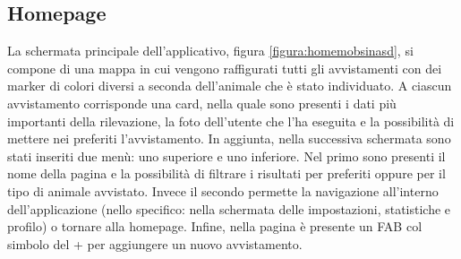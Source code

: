 \documentclass[a4paper,final,12pt]{report}
\begin{document}
\subsection{Homepage}
La schermata principale dell'applicativo, figura \ref{figura:homemobsinasd}, si compone di una mappa in cui vengono raffigurati tutti gli avvistamenti con dei marker di colori diversi a seconda dell'animale che è stato individuato. A ciascun avvistamento corrisponde una card, nella quale sono presenti i dati più importanti della rilevazione, la foto dell'utente che l'ha eseguita e la possibilità di mettere nei preferiti l'avvistamento. In aggiunta, nella successiva schermata sono stati inseriti due menù: uno superiore e uno inferiore. Nel primo sono presenti il nome della pagina e la possibilità di filtrare i risultati per preferiti oppure per il tipo di animale avvistato. Invece il secondo permette la navigazione all'interno dell'applicazione (nello specifico: nella schermata delle impostazioni, statistiche e profilo) o tornare alla homepage. Infine, nella pagina è presente un FAB col simbolo del + per aggiungere un nuovo avvistamento.
\end{document}
